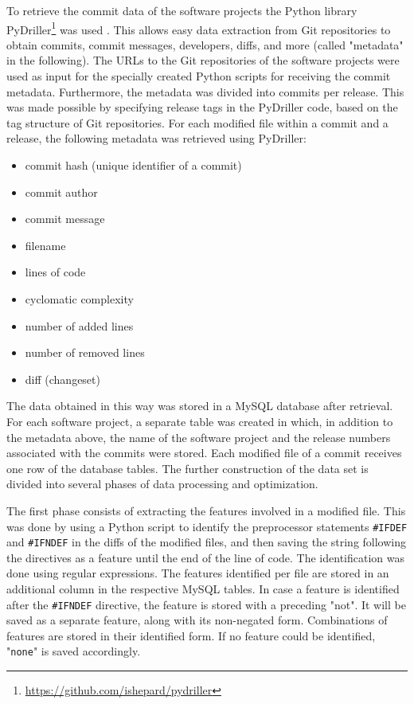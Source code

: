 To retrieve the commit data of the software projects the Python library PyDriller\footnote{\href{https://github.com/ishepard/pydriller}{https://github.com/ishepard/pydriller}} was used \cite{Spadini2018}. This allows easy data extraction from Git repositories to obtain commits, commit messages, developers, diffs, and more (called "metadata" in the following). The URLs to the Git repositories of the software projects were used as input for the specially created Python scripts for receiving the commit metadata. Furthermore, the metadata was divided into commits per release. This was made possible by specifying release tags in the PyDriller code, based on the tag structure of Git repositories. For each modified file within a commit and a release, the following metadata was retrieved using PyDriller:

\begin{itemize}
\item commit hash (unique identifier of a commit)
\item commit author
\item commit message
\item filename
\item lines of code
\item cyclomatic complexity
\item number of added lines
\item number of removed lines
\item diff (changeset)
\end{itemize}

The data obtained in this way was stored in a MySQL database after retrieval. For each software project, a separate table was created in which, in addition to the metadata above, the name of the software project and the release numbers associated with the commits were stored. Each modified file of a commit receives one row of the database tables. The further construction of the data set is divided into several phases of data processing and optimization.

The first phase consists of extracting the features involved in a modified file. This was done by using a Python script to identify the preprocessor statements \texttt{\#IFDEF} and \texttt{\#IFNDEF} in the diffs of the modified files, and then saving the string following the directives as a feature until the end of the line of code. The identification was done using regular expressions. The features identified per file are stored in an additional column in the respective MySQL tables. In case a feature is identified after the \texttt{\#IFNDEF} directive, the feature is stored with a preceding "not". It will be saved as a separate feature, along with its non-negated form. Combinations of features are stored in their identified form. If no feature could be identified, "\texttt{none}" is saved accordingly.

